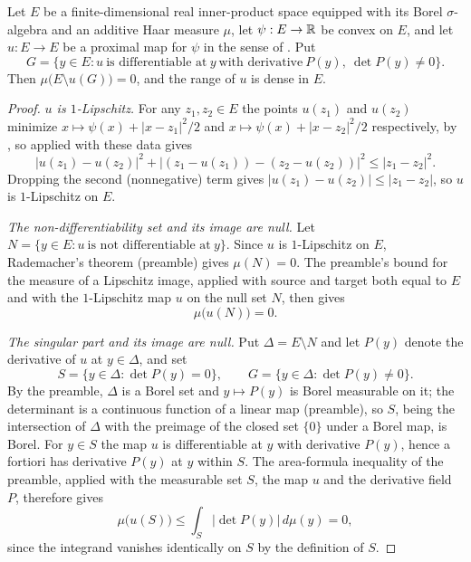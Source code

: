 \begin{lemma}
Let $E$ be a finite-dimensional real inner-product space equipped with its Borel
$\sigma$-algebra and an additive Haar measure $\mu$, let $\psi:E\to\mathbb{R}$ be convex
on $E$, and let $u:E\to E$ be a proximal map for $\psi$ in the sense of
. Put
\[
  G=\bigl\{y\in E:u\ \text{is differentiable at}\ y\ \text{with derivative}\
     P(y),\ \det P(y)\ne0\bigr\}.
\]
Then $\mu\bigl(E\setminus u(G)\bigr)=0$, and the range of $u$ is dense in $E$.
\end{lemma}
\begin{proof}
\emph{$u$ is $1$-Lipschitz.}
For any $z_1,z_2\in E$ the points $u(z_1)$ and $u(z_2)$ minimize
$x\mapsto\psi(x)+|x-z_1|^2/2$ and $x\mapsto\psi(x)+|x-z_2|^2/2$ respectively, by
\noderef{IsMoreauProx}, so \noderef{MoreauProxMonotone} applied with these data
gives
\begin{equation}\label{eq:mpifm-firm}
  |u(z_1)-u(z_2)|^2+\bigl|(z_1-u(z_1))-(z_2-u(z_2))\bigr|^2\le|z_1-z_2|^2 .
\end{equation}
Dropping the second (nonnegative) term gives $|u(z_1)-u(z_2)|\le|z_1-z_2|$, so
$u$ is $1$-Lipschitz on $E$.

\emph{The non-differentiability set and its image are null.}
Let $N=\{y\in E:u\ \text{is not differentiable at}\ y\}$. Since $u$ is
$1$-Lipschitz on $E$, Rademacher's theorem (preamble) gives $\mu(N)=0$. The
preamble's bound for the measure of a Lipschitz image, applied with source and
target both equal to $E$ and with the $1$-Lipschitz map $u$ on the null set $N$,
then gives
\begin{equation}\label{eq:mpifm-uN}
  \mu\bigl(u(N)\bigr)=0 .
\end{equation}

\emph{The singular part and its image are null.}
Put $\Delta=E\setminus N$ and let $P(y)$ denote the derivative of $u$ at
$y\in\Delta$, and set
\[
  S=\{y\in\Delta:\det P(y)=0\},\qquad
  G=\{y\in\Delta:\det P(y)\ne0\}.
\]
By the preamble, $\Delta$ is a Borel set and $y\mapsto P(y)$ is Borel measurable
on it; the determinant is a continuous function of a linear map (preamble), so
$S$, being the intersection of $\Delta$ with the preimage of the closed set
$\{0\}$ under a Borel map, is Borel. For $y\in S$ the map $u$ is differentiable
at $y$ with derivative $P(y)$, hence a fortiori has derivative $P(y)$ at $y$
within $S$. The area-formula inequality of the preamble, applied with the
measurable set $S$, the map $u$ and the derivative field $P$, therefore gives
\begin{equation}\label{eq:mpifm-uS}
  \mu\bigl(u(S)\bigr)\le\int_S\bigl|\det P(y)\bigr|\,d\mu(y)=0,
\end{equation}
since the integrand vanishes identically on $S$ by the definition of $S$.


\end{proof}
